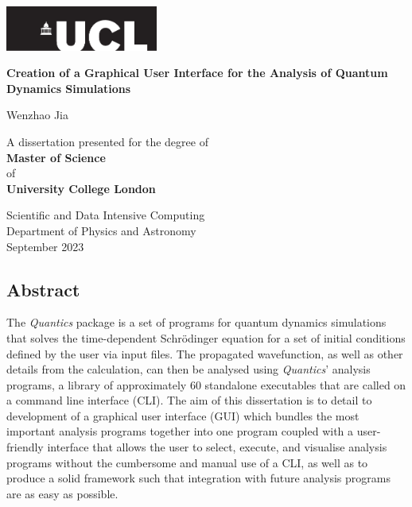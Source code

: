 \documentclass[12pt]{article}
\begin{document}
\sloppy %

\begin{titlepage}
    \begin{center}
        \vspace*{0.8cm}

        \includegraphics[page=1,width=5cm]{img/ucl.pdf}
        \vspace{0.5cm}

        \Huge\textbf{Creation of a Graphical User Interface for the Analysis of Quantum Dynamics Simulations}
        \vspace{1.5cm}
        
        \LARGE Wenzhao Jia
        
        \vfill
        
        A dissertation presented for the degree of\\
        \textbf{Master of Science}\\
        of\\
        \textbf{University College London}
        
        \vspace{0.8cm}
        
        \Large
        Scientific and Data Intensive Computing\\
        Department of Physics and Astronomy\\
        September 2023
    \end{center}
\end{titlepage}

\setcounter{page}{2}
\subsection*{Abstract}
The \textit{Quantics} package is a set of programs for quantum dynamics simulations that solves the time-dependent Schr\"odinger equation for a set of initial conditions defined by the user via input files. The propagated wavefunction, as well as other details from the calculation, can then be analysed using \textit{Quantics}' analysis programs, a library of approximately 60 standalone executables that are called on a command line interface (CLI). The aim of this dissertation is to detail to development of a graphical user interface (GUI) which bundles the most important analysis programs together into one program coupled with a user-friendly interface that allows the user to select, execute, and visualise analysis programs without the cumbersome and manual use of a CLI, as well as to produce a solid framework such that integration with future analysis programs are as easy as possible.
\end{document}
